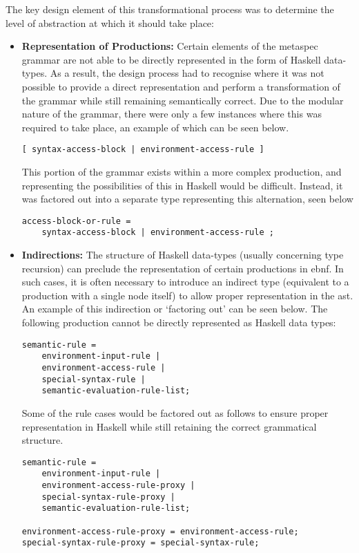 The key design element of this transformational process was to determine the level of abstraction at which it should take place:
\begin{itemize}
    \item \textbf{Representation of Productions:} Certain elements of the \gls{metaspec} grammar are not able to be directly represented in the form of Haskell data-types.
    As a result, the design process had to recognise where it was not possible to provide a direct representation and perform a transformation of the grammar while still remaining semantically correct.
    Due to the modular nature of the grammar, there were only a few instances where this was required to take place, an example of which can be seen below.
    \begin{verbatim}
[ syntax-access-block | environment-access-rule ]
    \end{verbatim}
    This portion of the grammar exists within a more complex production, and representing the possibilities of this in Haskell would be difficult.
    Instead, it was factored out into a separate type representing this alternation, seen below
    \begin{verbatim}
access-block-or-rule = 
    syntax-access-block | environment-access-rule ;
    \end{verbatim}
    \item \textbf{Indirections:} The structure of Haskell data-types (usually concerning type recursion) can preclude the representation of certain productions in \gls{ebnf}. 
    In such cases, it is often necessary to introduce an indirect type (equivalent to a production with a single node itself) to allow proper representation in the \gls{ast}. 
    An example of this indirection or `factoring out' can be seen below.
    The following production cannot be directly represented as Haskell data types:
    \begin{verbatim}
semantic-rule = 
    environment-input-rule |
    environment-access-rule |
    special-syntax-rule |
    semantic-evaluation-rule-list;
    \end{verbatim}
    Some of the rule cases would be factored out as follows to ensure proper representation in Haskell while still retaining the correct grammatical structure.
    \begin{verbatim}
semantic-rule = 
    environment-input-rule |
    environment-access-rule-proxy |
    special-syntax-rule-proxy |
    semantic-evaluation-rule-list;

environment-access-rule-proxy = environment-access-rule;
special-syntax-rule-proxy = special-syntax-rule;
    \end{verbatim}
\end{itemize}

